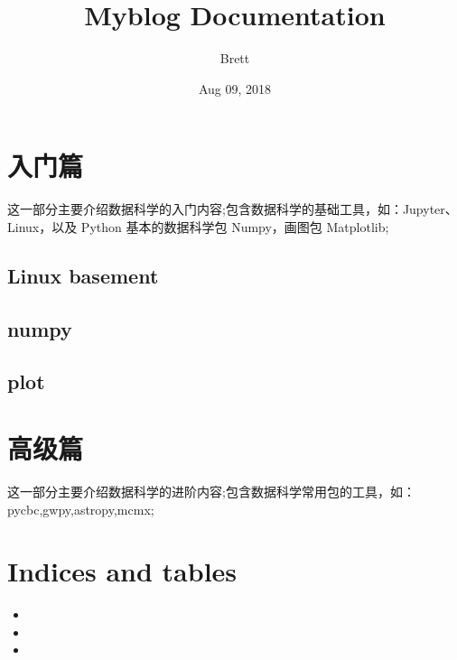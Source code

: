 \documentclass[letterpaper,10pt,english]{sphinxmanual}
\title{Myblog Documentation}
\date{Aug 09, 2018}
\author{Brett}
\begin{document}
\maketitle
\sphinxtableofcontents
{}\label{\detokenize{index::doc}}



\chapter{入门篇}
\label{\detokenize{base/index:welcome-to-myblog-s-documentation}}\label{\detokenize{base/index::doc}}\label{\detokenize{base/index:id1}}
这一部分主要介绍数据科学的入门内容;包含数据科学的基础工具，如：Jupyter、Linux，以及 Python 基本的数据科学包 Numpy，画图包 Matplotlib;


\section{Linux basement}
\label{\detokenize{base/01_linux::doc}}\label{\detokenize{base/01_linux:linux-basement}}

\section{numpy}
\label{\detokenize{base/03_numpy:numpy}}\label{\detokenize{base/03_numpy::doc}}

\section{plot}
\label{\detokenize{base/04_matplotlib:plot}}\label{\detokenize{base/04_matplotlib::doc}}

\chapter{高级篇}
\label{\detokenize{advanced/index::doc}}\label{\detokenize{advanced/index:id1}}
这一部分主要介绍数据科学的进阶内容;包含数据科学常用包的工具，如：
pycbc,gwpy,astropy,mcmx;


\chapter{Indices and tables}
\label{\detokenize{index:indices-and-tables}}\label{\detokenize{index::doc}}\begin{itemize}
\item {} 

\item {} 

\item {} 

\end{itemize}



\renewcommand{\indexname}{Index}
\printindex
\end{document}
